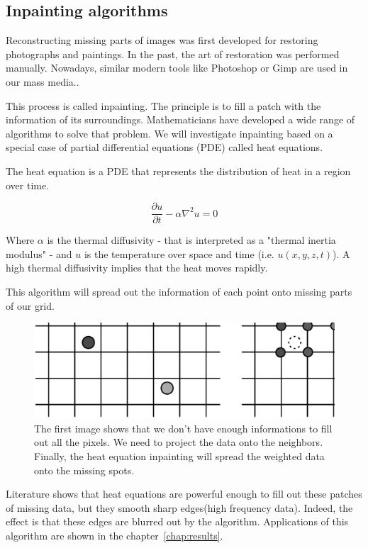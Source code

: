 \subsection{Inpainting algorithms}

Reconstructing missing parts of images was first developed for restoring photographs and paintings. In the past, the art of restoration was performed manually. Nowadays, similar modern tools like Photoshop or Gimp are used in our mass media.\cite{richard2001fast}.

This process is called inpainting. The principle is to fill a patch with the information of its surroundings. Mathematicians have developed a wide range of algorithms to solve that problem. We will investigate inpainting based on a special case of partial differential equations (PDE) called heat equations. 

The heat equation is a PDE that represents the distribution of heat in a region over time. 

\begin{equation}\label{eqn:heateq}
\frac{\partial u}{\partial t} - \alpha \nabla^2 u = 0
\end{equation}

Where $\alpha$ is the thermal diffusivity - that is interpreted as a "thermal inertia modulus" - and $u$ is the temperature over space and time (i.e. $u(x,y,z,t)$). A high thermal diffusivity implies that the heat moves rapidly.

This algorithm will spread out the information of each point onto missing parts of our grid.

\begin{figure}[!ht]
  \centering
  \includegraphics[scale=0.3]{images/inpainting3step.eps}
    \caption{The first image shows that we don't have enough informations to fill out all the pixels. We need to project the data onto the neighbors. Finally, the heat equation inpainting will spread the weighted data onto the missing spots.}
  \label{inpainting3step}
\end{figure}

Literature shows that heat equations are powerful enough to fill out these patches of missing data, but they smooth sharp edges(high frequency data)\cite{aubert2006mathematical}. Indeed, the effect is that these edges are blurred out by the algorithm. Applications of this algorithm are shown in the chapter~\ref{chap:results}.


